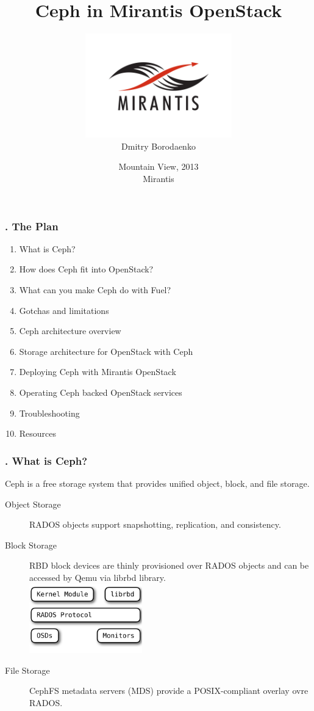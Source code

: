 \documentclass[hyperref=unicode,utf8,xcolor=pst]{beamer}
\title{Ceph in Mirantis OpenStack}
\author{\includegraphics[height=4.5cm]{Vector_RGB_MirantisLogo}\\Dmitry Borodaenko}
\date{Mountain View, 2013\\ Mirantis}
\begin{document}
\begin{frame}
	\titlepage
\end{frame}

\begin{frame}
	\setcounter{framenumber}{1}
	\frametitle{\insertframenumber{}. The Plan}
	\begin{enumerate}
		\item What is Ceph?
		\item How does Ceph fit into OpenStack?
		\item What can you make Ceph do with Fuel?
		\item Gotchas and limitations
		\item Ceph architecture overview
		\item Storage architecture for OpenStack with Ceph
		\item Deploying Ceph with Mirantis OpenStack
		\item Operating Ceph backed OpenStack services
		\item Troubleshooting
		\item Resources
	\end{enumerate}
\end{frame}

\begin{frame}
	\frametitle{\insertframenumber{}. What is Ceph?}
	Ceph is a free storage system that provides unified object,
	block, and file storage.

	\begin{description}
		\item[Object Storage] RADOS objects support
			snapshotting, replication, and consistency.
		\item[Block Storage] RBD block devices are thinly
			provisioned over RADOS objects and can be
			accessed by Qemu via librbd library.\\
			\includegraphics[height=3cm]{ceph-rbd}
		\item[File Storage] CephFS metadata servers (MDS)
			provide a POSIX-compliant overlay ovre RADOS.
	\end{description}
\end{frame}
\end{document}
